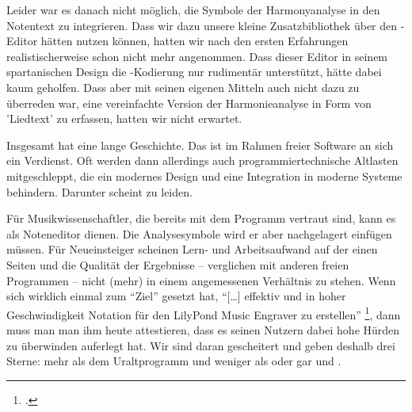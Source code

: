 Leider war es danach nicht möglich, die Symbole der Harmonyanalyse in den
Notentext zu integrieren. Dass wir dazu unsere kleine Zusatzbibliothek über den
-Editor hätten nutzen können, hatten wir nach den ersten
Erfahrungen realistischerweise schon nicht mehr angenommen. Dass dieser Editor in
seinem spartanischen Design die -Kodierung nur rudimentär
unterstützt, hätte dabei kaum geholfen. Dass aber  mit seinen
eigenen Mitteln auch nicht dazu zu überreden war, eine vereinfachte Version der
Harmonieanalyse in Form von 'Liedtext' zu erfassen, hatten wir nicht erwartet.

Insgesamt hat  eine lange Geschichte. Das ist im Rahmen freier
Software an sich ein Verdienst. Oft werden dann allerdings auch
programmiertechnische Altlasten mitgeschleppt, die ein modernes Design
und eine Integration in moderne Systeme behindern. Darunter scheint 
zu leiden.

Für Musikwissenschaftler, die bereits mit dem Programm vertraut sind, kann es
als Noteneditor dienen. Die Analysesymbole wird er aber nachgelagert einfügen
müssen. Für Neueinsteiger scheinen Lern- und Arbeitsaufwand auf der einen Seiten
und die Qualität der Ergebnisse -- verglichen mit anderen freien Programmen --
nicht (mehr) in einem angemessenen Verhältnis zu stehen. Wenn  sich
wirklich einmal zum \enquote{Ziel} gesetzt hat, \enquote{[\ldots] effektiv und
in hoher Geschwindigkeit Notation für den LilyPond Music Engraver zu erstellen}
\footcite[vgl.][\nopage wp]{WpedDenemo2018a}, dann muss man man ihm heute
attestieren, dass es seinen Nutzern dabei hohe Hürden zu überwinden auferlegt
hat. Wir sind daran gescheitert und geben  deshalb drei Sterne:
mehr als dem Uraltprogramm  und weniger als  oder gar 
 und .
%
